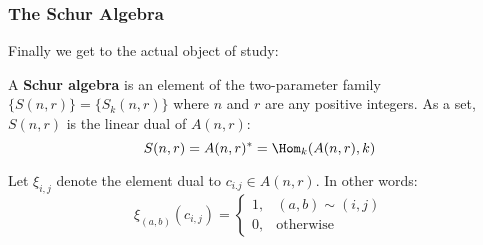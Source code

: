\documentclass[12pt]{article}
\begin{document}
\subsubsection{The Schur Algebra}
Finally we get to the actual object of study:
\begin{defn}
	A \textbf{Schur algebra} is an element of the two-parameter family $\{S(n,r)\}=\{S_k(n,r)\}$ where $n$ and $r$ are any positive integers.
	As a set, $S(n,r)$ is the linear dual of $A(n,r)$:
	\[S(n,r)=A(n,r)^\ast=\Hom_k(A(n,r),k)\] 

	Let $\xi_{i,j}$ denote the element dual to $c_{i.j}\in A(n,r)$. In other words:
	\[\xi_{(a,b)}(c_{i,j})=\begin{cases}
		1, & (a,b)\sim(i,j)\\
		0, & \text{otherwise}
	\end{cases}\]
\end{defn}
\end{document}
